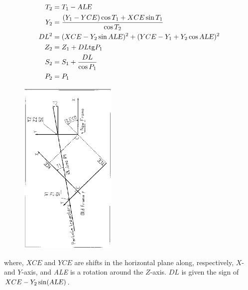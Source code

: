 \begin{figure}[h]
\begin{minipage}{.4\linewidth}
\begin{align*}
	T_2 &=  T_1- \text{\textsl{ALE}} \\
	Y_2 & = \dfrac{ (Y_1-YCE) \cos T_1+XCE \sin T_1}{\cos  T_2} \\
	DL^2 & =(XCE-Y_2 \sin \text{\textsl{ALE}})^2 
	         +(YCE-Y_1+Y_2 \cos \text{\textsl{ALE}})^2 \\
	Z_2  & = Z_1+DL\mathrm{tg} P_1 \\ 
	S_2 & = S_1+ \dfrac{DL }{ \cos P_1} \\
	P_2 & = P_1  
\end{align*}
\end{minipage}
\begin{minipage}{.5\linewidth}
\centerline{\includegraphics[height=8.5cm,angle=-90]{FigCHAREFa.eps}}
\end{minipage}
\end{figure}

\noindent where, $ XCE $ and $ YCE $ are shifts in the horizontal plane along, respectively, 
$ X$- and $ Y$-axis, and \textsl{ALE}  is a rotation around the $ Z$-axis. $ DL $
is given the sign of $ XCE-Y_2 \sin(\text{\textsl{ALE}})$.  



